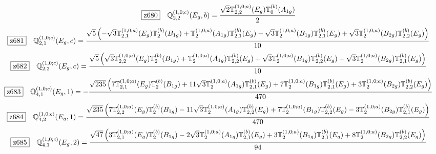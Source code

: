 \documentclass[fleqn,10pt,landscape]{jsarticle}
\begin{document}
\begin{dmath*}
\hspace*{3mm}\fbox{z680}\quad \mathbb{Q}_{2,2}^{(1,0;c)}(E_{g},b)=\frac{\sqrt{2} \mathbb{T}_{2,2}^{(1,0;a)}(E_{g}) \mathbb{T}_{0}^{(b)}(A_{1g})}{2}
\end{dmath*}
\begin{dmath*}
\hspace*{3mm}\fbox{z681}\quad \mathbb{Q}_{2,1}^{(1,0;c)}(E_{g},c)=\frac{\sqrt{5} \left(- \sqrt{3} \mathbb{T}_{2,1}^{(1,0;a)}(E_{g}) \mathbb{T}_{2}^{(b)}(B_{1g}) + \mathbb{T}_{2}^{(1,0;a)}(A_{1g}) \mathbb{T}_{2,1}^{(b)}(E_{g}) - \sqrt{3} \mathbb{T}_{2}^{(1,0;a)}(B_{1g}) \mathbb{T}_{2,1}^{(b)}(E_{g}) + \sqrt{3} \mathbb{T}_{2}^{(1,0;a)}(B_{2g}) \mathbb{T}_{2,2}^{(b)}(E_{g})\right)}{10}
\end{dmath*}
\begin{dmath*}
\hspace*{3mm}\fbox{z682}\quad \mathbb{Q}_{2,2}^{(1,0;c)}(E_{g},c)=\frac{\sqrt{5} \left(\sqrt{3} \mathbb{T}_{2,2}^{(1,0;a)}(E_{g}) \mathbb{T}_{2}^{(b)}(B_{1g}) + \mathbb{T}_{2}^{(1,0;a)}(A_{1g}) \mathbb{T}_{2,2}^{(b)}(E_{g}) + \sqrt{3} \mathbb{T}_{2}^{(1,0;a)}(B_{1g}) \mathbb{T}_{2,2}^{(b)}(E_{g}) + \sqrt{3} \mathbb{T}_{2}^{(1,0;a)}(B_{2g}) \mathbb{T}_{2,1}^{(b)}(E_{g})\right)}{10}
\end{dmath*}
\begin{dmath*}
\hspace*{3mm}\fbox{z683}\quad \mathbb{Q}_{4,1}^{(1,0;c)}(E_{g},1)=- \frac{\sqrt{235} \left(7 \mathbb{T}_{2,1}^{(1,0;a)}(E_{g}) \mathbb{T}_{2}^{(b)}(B_{1g}) + 11 \sqrt{3} \mathbb{T}_{2}^{(1,0;a)}(A_{1g}) \mathbb{T}_{2,1}^{(b)}(E_{g}) + 7 \mathbb{T}_{2}^{(1,0;a)}(B_{1g}) \mathbb{T}_{2,1}^{(b)}(E_{g}) + 3 \mathbb{T}_{2}^{(1,0;a)}(B_{2g}) \mathbb{T}_{2,2}^{(b)}(E_{g})\right)}{470}
\end{dmath*}
\begin{dmath*}
\hspace*{3mm}\fbox{z684}\quad \mathbb{Q}_{4,2}^{(1,0;c)}(E_{g},1)=\frac{\sqrt{235} \left(7 \mathbb{T}_{2,2}^{(1,0;a)}(E_{g}) \mathbb{T}_{2}^{(b)}(B_{1g}) - 11 \sqrt{3} \mathbb{T}_{2}^{(1,0;a)}(A_{1g}) \mathbb{T}_{2,2}^{(b)}(E_{g}) + 7 \mathbb{T}_{2}^{(1,0;a)}(B_{1g}) \mathbb{T}_{2,2}^{(b)}(E_{g}) - 3 \mathbb{T}_{2}^{(1,0;a)}(B_{2g}) \mathbb{T}_{2,1}^{(b)}(E_{g})\right)}{470}
\end{dmath*}
\begin{dmath*}
\hspace*{3mm}\fbox{z685}\quad \mathbb{Q}_{4,1}^{(1,0;c)}(E_{g},2)=\frac{\sqrt{47} \left(3 \mathbb{T}_{2,1}^{(1,0;a)}(E_{g}) \mathbb{T}_{2}^{(b)}(B_{1g}) - 2 \sqrt{3} \mathbb{T}_{2}^{(1,0;a)}(A_{1g}) \mathbb{T}_{2,1}^{(b)}(E_{g}) + 3 \mathbb{T}_{2}^{(1,0;a)}(B_{1g}) \mathbb{T}_{2,1}^{(b)}(E_{g}) + 8 \mathbb{T}_{2}^{(1,0;a)}(B_{2g}) \mathbb{T}_{2,2}^{(b)}(E_{g})\right)}{94}
\end{dmath*}
\end{document}
